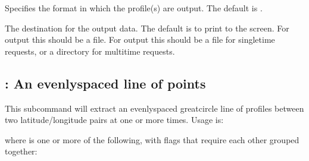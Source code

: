 \documentclass[letterpaper,10pt,english]{sphinxmanual}
\begin{document}
\sphinxAtStartPar
{}
\begin{description}
\sphinxAtStartPar
Specifies the format in which the profile(s) are output.  The default is .

\sphinxAtStartPar
The destination for the output data.  The default is to print to the screen.  For  output this should be a file.  For  output this should be a file for single\sphinxhyphen{}time requests, or a directory for multi\sphinxhyphen{}time requests.

\sphinxAtStartPar
{}

\sphinxAtStartPar
{}

\end{description}


\subsection{: An evenly\sphinxhyphen{}spaced line of points}
\label{\detokenize{userguide:line-an-evenly-spaced-line-of-points}}
\sphinxAtStartPar
This subcommand will extract an evenly\sphinxhyphen{}spaced great\sphinxhyphen{}circle line of profiles between two latitude/longitude pairs at one or more times.  Usage is:

\sphinxAtStartPar
{}

\sphinxAtStartPar
where \sphinxcode{\sphinxupquote{{[}flags{]}}} is one or more of the following, with flags that require each other grouped together:
\end{document}
